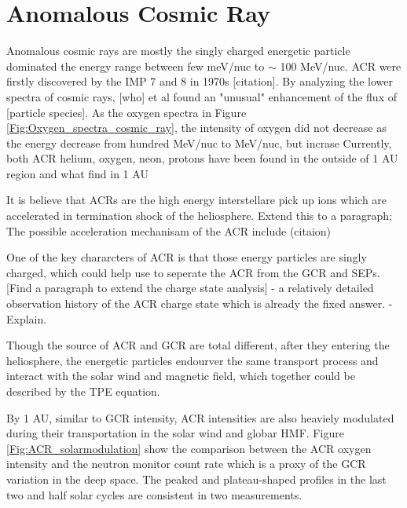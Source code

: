 	


\section{Anomalous Cosmic Ray}

Anomalous cosmic rays are mostly the singly charged energetic particle dominated the energy range between few meV/nuc to $\sim$ 100 MeV/nuc. \acs{ACR} were firstly discovered by the \acs{IMP} 7 and 8 in 1970s [citation]. By analyzing the lower spectra of cosmic rays, [who] et al found an "unusual" enhancement of the flux of [particle species]. As the oxygen spectra in Figure \ref{Fig:Oxygen_spectra_cosmic_ray}, the intensity of oxygen did not decrease as the energy decrease from hundred MeV/nuc to MeV/nuc, but incrase
Currently, both ACR helium, oxygen, neon, protons have been found in the outside of 1 AU region and what find in 1 AU

It is believe that ACRs are the high energy interstellare pick up ions which are accelerated in termination shock of the heliosphere. Extend this to a paragraph;
The possible acceleration mechanisam of the ACR include  (citaion)

One of the key chararcters of ACR is that those energy particles are singly charged, which could help use to seperate the ACR from the GCR and SEPs. [Find a paragraph to extend the charge state analysis] - a relatively detailed observation history of the ACR charge state which is already the fixed answer. - Explain.

Though the source of ACR and GCR are total different, after they entering the heliosphere, the energetic particles endourver the same transport process and interact with the solar wind and magnetic field,  which together could be described by the TPE equation.

By 1 AU, similar to GCR intensity, ACR intensities are also heaviely modulated during their transportation in the solar wind and globar \ac{HMF}. Figure \ref{Fig:ACR_solarmodulation} show the comparison between the ACR oxygen intensity and the neutron monitor count rate which is a proxy of the GCR variation in the deep space. The peaked and plateau-shaped profiles in the last two and half solar cycles are consistent in two measurements.



